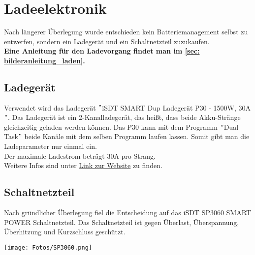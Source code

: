\section{Ladeelektronik}
Nach längerer Überlegung wurde entschieden kein Batteriemanagement selbst zu entwerfen, sondern ein Ladegerät und ein Schaltnetzteil zuzukaufen. \\

\textbf{Eine Anleitung für den Ladevorgang findet man im \autoref{sec: bilderanleitung_laden}.}


\subsection{Ladegerät}
Verwendet wird das Ladegerät $"$iSDT SMART Dup Ladegerät P30 - 1500W, 30A$"$. Das Ladegerät ist ein 2-Kanalladegerät, das heißt, 
dass beide Akku-Stränge gleichzeitig geladen werden können. 
Das P30 kann mit dem Programm $"$Dual Task$"$ beide Kanäle mit dem selben Programm laufen lassen. Somit gibt man die Ladeparameter nur einmal ein. \\
Der maximale Ladestrom beträgt 30$\mathrm{A}$ pro Strang. \\
Weitere Infos sind unter \href{https://www.modell-hubschrauber.at/Ladegeraete-Netzteile-Ladekabel-und-Zubehoer/Ladegeraete/Ladegeraete-12Volt/iSDT-SMART-Dup-Ladegeraet-P30-1500W-30A-8S-Lipo::43075.html}{Link zur Website} 
zu finden. 

\subsection{Schaltnetzteil}
Nach gründlicher Überlegung fiel die Entscheidung auf das \glqq iSDT SP3060 SMART POWER Schaltnetzteil\grqq .
Das Schaltnetzteil ist gegen Überlast, Überspannung, Überhitzung und Kurzschluss geschützt. 

\begin{minipage}{13cm}
    \centering
    \texttt{[image: Fotos/SP3060.png]}
\end{minipage}

\newpage

